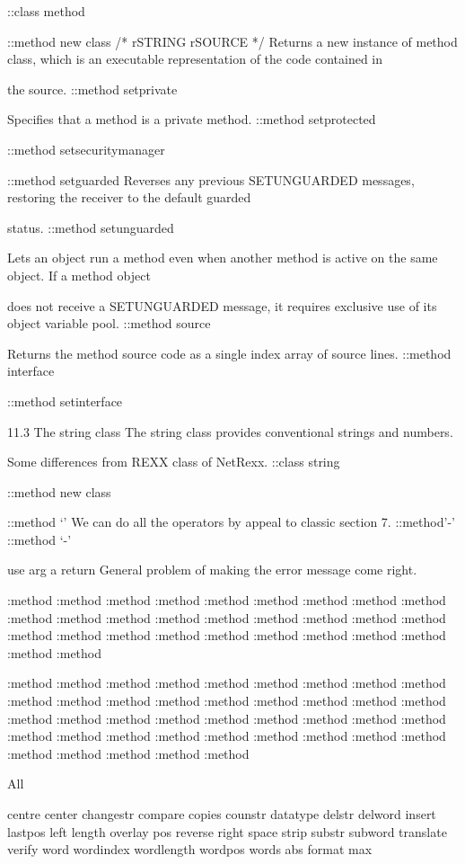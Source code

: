 ::class method

::method new class /* rSTRING rSOURCE */ Returns a new instance of
method class, which is an executable representation of the code
contained in

the source. ::method setprivate

Specifies that a method is a private method. ::method setprotected

::method setsecuritymanager

::method setguarded Reverses any previous SETUNGUARDED messages,
restoring the receiver to the default guarded

status. ::method setunguarded

Lets an object run a method even when another method is active on the
same object. If a method object

does not receive a SETUNGUARDED message, it requires exclusive use of
its object variable pool. ::method source

Returns the method source code as a single index array of source lines.
::method interface

::method setinterface

11.3 The string class The string class provides conventional strings and
numbers.

Some differences from REXX class of NetRexx. ::class string

::method new class

::method `' We can do all the operators by appeal to classic section 7.
::method'-' ::method `-'

use arg a return \a General problem of making the error message come
right.

:method :method :method :method :method :method :method :method :method
:method :method :method :method :method :method :method :method :method
:method :method :method :method :method :method :method :method :method
:method :method

:method :method :method :method :method :method :method :method :method
:method :method :method :method :method :method :method :method :method
:method :method :method :method :method :method :method :method :method
:method :method :method :method :method :method :method :method :method
:method :method :method :method :method

All

centre center changestr compare copies counstr datatype delstr delword
insert lastpos left length overlay pos reverse right space strip substr
subword translate verify word wordindex wordlength wordpos words abs
format max

